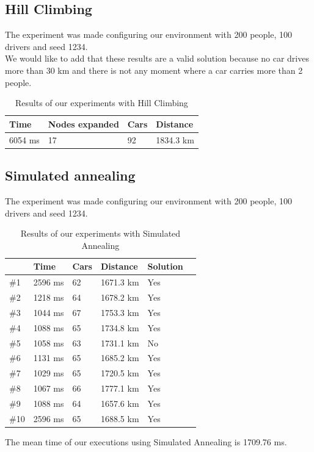\documentclass[12]{article}
\begin{document}
\subsection{Hill Climbing}

The experiment was made configuring our environment with 200 people, 100 drivers and seed 1234.
\\

We would like to add that these results are a valid solution because no car drives more than 30 km and there is not any moment where a car carries more than 2 people. 
\\

\begin{table}[h]
\centering
\begin{tabular}{|l|l|l|l|}
\hline \textbf{Time} &
 \textbf{Nodes expanded} & \textbf{Cars} & \textbf{Distance}\\  \hline
6054 ms &  17 & 92 & 1834.3 km \\ \hline
\end{tabular}
\caption{Results of our experiments with Hill Climbing}
\label{Results}
\end{table}

\subsection{Simulated annealing}
The experiment was made configuring our environment with 200 people, 100 drivers and seed 1234.
\\


\begin{table}[h]
\centering
\begin{tabular}{|l|l|l|l|l|l|}
\hline & \textbf{Time}  & \textbf{Cars} & \textbf{Distance} & \textbf{Solution}\\  \hline
 \#1 & 2596 ms  & 62 & 1671.3 km & Yes \\ \hline
 \#2 & 1218 ms & 64 & 1678.2 km & Yes \\ \hline
  \#3 & 1044 ms & 67 & 1753.3 km & Yes \\ \hline
 \#4 & 1088 ms & 65 & 1734.8 km & Yes \\ \hline
 \#5 & 1058 ms & 63 & 1731.1 km & No \\ \hline
 \#6 & 1131 ms & 65 & 1685.2 km & Yes \\ \hline
 \#7 & 1029 ms & 65 & 1720.5 km & Yes \\ \hline
 \#8 & 1067 ms & 66 & 1777.1 km & Yes \\ \hline
 \#9 & 1088 ms & 64 & 1657.6 km & Yes\\ \hline
 \#10 & 2596 ms & 65 & 1688.5 km & Yes \\ \hline

\end{tabular}
\caption{Results of our experiments with Simulated Annealing}
\label{Results2}
\end{table}

The mean time of our executions using Simulated Annealing is 1709.76 ms. 
\end{document}
